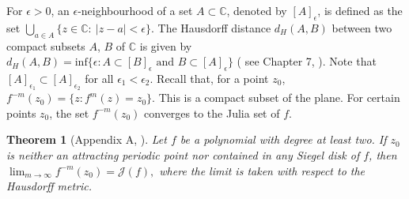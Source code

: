 \documentclass[12pt,a4paper]{article}
\theoremstyle{plain}
\newtheorem{theorem}{Theorem}[section]
\numberwithin{equation}{section}
\begin{document}
For $\epsilon >0$, an  $\epsilon$-neighbourhood of a set $A \subset \mathbb{C}$, denoted by  $[A]_{\epsilon}$, is defined as the set $\bigcup_{a\in A}\{z \in \mathbb{C}:~|z-a| < \epsilon\}$.  The Hausdorff distance $d_H (A,B)$ between two compact subsets $A$, $B$ of $\mathbb{C}$ is given by $d_H(A,B) = \text{inf}\{\epsilon: A\subset [B]_{\epsilon} \text{ and } B\subset [A]_{\epsilon}\}$ ( see Chapter 7, \cite{munkres}). Note that $[A]_{\epsilon_1} \subset [A]_{\epsilon_2}$ for all $\epsilon_1  < \epsilon_2$. Recall that, for a point $z_0$, $f^{-m}(z_0) =\{z: f^m (z)=z_0\}$. This is a compact subset of the plane. For certain points $z_0$, the set $f^{-m}(z_0)$ converges to the Julia set of $f$.
 
\begin{theorem}[Appendix A, \cite{brownetal2003}]
        Let \(f\) be a polynomial with degree at least two. If \(z_0\) is neither an attracting periodic point nor contained in any Siegel disk of $f$, then $ \lim_{m\rightarrow \infty}f^{-m}(z_0) = \mathcal{J}(f),$ where the limit is taken with respect to the Hausdorff metric.
        \label{Thm5}
    \end{theorem}
\end{document}
